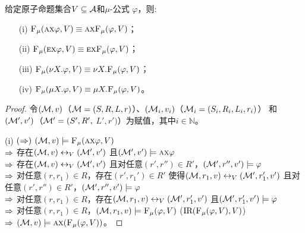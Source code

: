 \begin{proposition}[同质性]\label{chapter06:pro:mu:forget:2}
	给定原子命题集合$V\subseteq\cal A$和$\mu$-公式 $\varphi$，则: %
	\begin{itemize}
		\item[(i)] ${\textsc{F}_{\textsc{$\mu$}}}(\textsc{a}\textsc{x}\varphi,V)\equiv \textsc{a}\textsc{x} {\textsc{F}_{\textsc{$\mu$}}}(\varphi,V)$；
		\item[(ii)] ${\textsc{F}_{\textsc{$\mu$}}}(\textsc{e}\textsc{x}\varphi,V)\equiv\textsc{e}\textsc{x} {\textsc{F}_{\textsc{$\mu$}}}(\varphi,V)$；
		\item[(iii)] ${\textsc{F}_{\textsc{$\mu$}}}(\nu X. \varphi, V) \equiv \nu X. {\textsc{F}_{\textsc{$\mu$}}}(\varphi, V)$；
		\item[(iv)] ${\textsc{F}_{\textsc{$\mu$}}}(\mu X. \varphi, V) \equiv \mu X. {\textsc{F}_{\textsc{$\mu$}}}(\varphi, V)$。
	\end{itemize}
\end{proposition}
\begin{proof}
	令$({\cal M},v)$（${\cal M}=(S,R, L, r)$）、$({\cal M}_i, v_i)$（${\cal M}_i = (S_i, R_i, L_i, r_i)$） 和$({\cal M}',v')$（${\cal M}'=(S', R',$ $L', r')$）为赋值，其中$i\in \mathbb{N}$。
	
	(i) 
	$(\Rightarrow)$ $({\cal M},v) \models {\textsc{F}_{\textsc{$\mu$}}}(\textsc{a}\textsc{x} \varphi, V)$\\
	$\Rightarrow$ 存在$({\cal M},v) \leftrightarrow_V ({\cal M}', v')$ 且$({\cal M}', v') \models \textsc{a}\textsc{x} \varphi$\\
	$\Rightarrow$ 存在$({\cal M},v) \leftrightarrow_V ({\cal M}', v')$ 且对任意$(r', r'') \in R'$，$({\cal M}',r'', v') \models \varphi$\\
	$\Rightarrow$ 对任意$(r,r_1)\in R$，存在$(r', r_1') \in R'$ 使得$({\cal M},r_1, v) \leftrightarrow_V ({\cal M}',r_1',v')$ 且对任意$(r', r'') \in R'$，$({\cal M}',r'', v') \models \varphi$\\
	$\Rightarrow$ 对任意$(r,r_1)\in R$，存在$({\cal M},r_1, v) \leftrightarrow_V ({\cal M}',r_1',v')$ 且$({\cal M}',r_1',v') \models \varphi$\\
	$\Rightarrow$ 对任意$(r,r_1)\in R$，$({\cal M},r_1, v) \models {\textsc{F}_{\textsc{$\mu$}}}(\varphi,V)$ \hfill ($\textrm{IR}({\textsc{F}_{\textsc{$\mu$}}}(\varphi,V), V)$)\\
	$\Rightarrow$ $({\cal M},v)\models \textsc{a} \textsc{x} ({\textsc{F}_{\textsc{$\mu$}}}(\varphi,V))$。
	

\end{proof}
